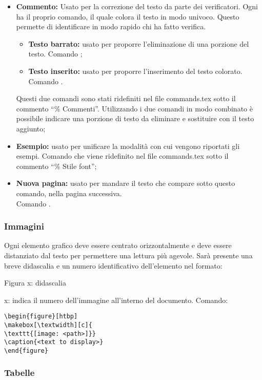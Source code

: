 \begin{itemize}
	\item \textbf{Commento:} Usato per la correzione del testo da parte dei verificatori. Ogni \roleVerifier{} ha il proprio comando, il quale colora il testo in modo univoco. Questo permette di identificare in modo rapido chi ha fatto verifica.
	\begin{itemize}
		\item \textbf{Testo barrato:} usato per proporre l'eliminazione di una porzione del testo. Comando ;
		\item \textbf{Testo inserito:} usato per proporre l'inserimento del testo colorato. Comando .
	\end{itemize}
	
	Questi due comandi sono stati ridefiniti nel file commands.tex sotto il commento “\% Commenti”.
	Utilizzando i due comandi in modo combinato è possibile indicare una porzione di testo da eliminare e sostituire con il testo aggiunto;
	
	\item \textbf{Esempio:} usato per unificare la modalità con cui vengono riportati gli esempi. Comando  che viene ridefinito nel file commands.tex sotto il commento “\% Stile font”;
	\item \textbf{Nuova pagina:} usato per mandare il testo che compare sotto questo comando, nella pagina successiva.\\
	Comando .
\end{itemize}

\subsubsection{Immagini}
Ogni elemento grafico deve essere centrato orizzontalmente e deve essere distanziato dal testo per permettere una lettura più agevole. Sarà presente una breve didascalia e un numero identificativo dell'elemento nel formato:
\begin{center}
	Figura x: didascalia
\end{center}
x: indica il numero dell'immagine all'interno del documento.
Comando:
\begin{lstlisting}
\begin{figure}[htbp]
\makebox[\textwidth][c]{
\texttt{[image: <path>]}}
\caption{<text to display>}
\end{figure}
\end{lstlisting}


\subsubsection{Tabelle}
